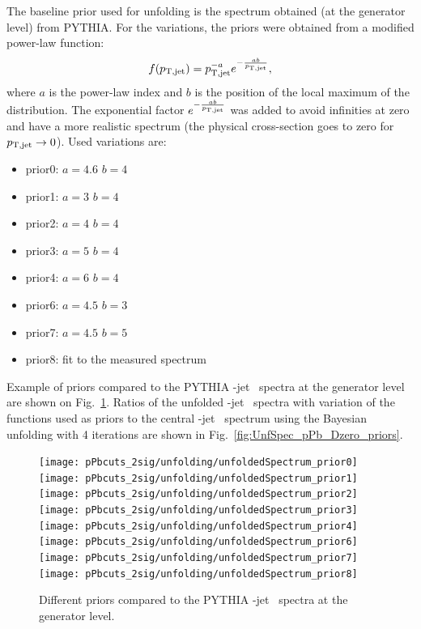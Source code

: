 The baseline prior used for unfolding is the spectrum obtained (at the generator level) from PYTHIA.
For the variations, the priors were obtained from a modified power-law function:
\begin{equation}
f(p_{\mathrm{T,jet}}) = p_{\mathrm{T,jet}}^{-a}e^{-\frac{ab}{p_{\mathrm{T,jet}}}},
\end{equation}
where $a$ is the power-law index and $b$ is the position of the local maximum of the distribution. The exponential factor $e^{-\frac{ab}{p_{\mathrm{T,jet}}}}$ was added to avoid infinities at zero and have a more realistic spectrum (the physical cross-section goes to zero for $p_{\mathrm{T,jet}} \to 0$).
Used variations are: 
\begin{itemize}
\item prior0: $a=4.6$ $b=4$~\GeVc\ 
\item prior1: $a=3$ $b=4$~\GeVc\
\item prior2: $a=4$ $b=4$~\GeVc\
\item prior3: $a=5$ $b=4$~\GeVc\
\item prior4: $a=6$ $b=4$~\GeVc\
\item prior6: $a=4.5$ $b=3$~\GeVc\
\item prior7: $a=4.5$ $b=5$~\GeVc\
\item prior8: fit to the measured spectrum
\end{itemize}


Example of priors compared to the PYTHIA \Dzero-jet \pt\ spectra at the generator level are shown on Fig.~\ref{fig:UnfSpec_pPb_Dzero_priors_all}.
Ratios of the unfolded \Dzero-jet \pt\ spectra with variation of the functions used as priors to the central \Dzero-jet \pt\ spectrum using the Bayesian unfolding with 4 iterations are shown in Fig.~\ref{fig:UnfSpec_pPb_Dzero_priors}. 

\begin{figure}[bth]
\centering
\texttt{[image: pPbcuts\_2sig/unfolding/unfoldedSpectrum\_prior0]}
\texttt{[image: pPbcuts\_2sig/unfolding/unfoldedSpectrum\_prior1]}
\texttt{[image: pPbcuts\_2sig/unfolding/unfoldedSpectrum\_prior2]}
\texttt{[image: pPbcuts\_2sig/unfolding/unfoldedSpectrum\_prior3]}
\texttt{[image: pPbcuts\_2sig/unfolding/unfoldedSpectrum\_prior4]}
\texttt{[image: pPbcuts\_2sig/unfolding/unfoldedSpectrum\_prior6]}
\texttt{[image: pPbcuts\_2sig/unfolding/unfoldedSpectrum\_prior7]}
\texttt{[image: pPbcuts\_2sig/unfolding/unfoldedSpectrum\_prior8]}
\caption{Different priors compared to the PYTHIA \Dzero-jet \pt\ spectra at the generator level.}
\label{fig:UnfSpec_pPb_Dzero_priors_all}
\end{figure}

